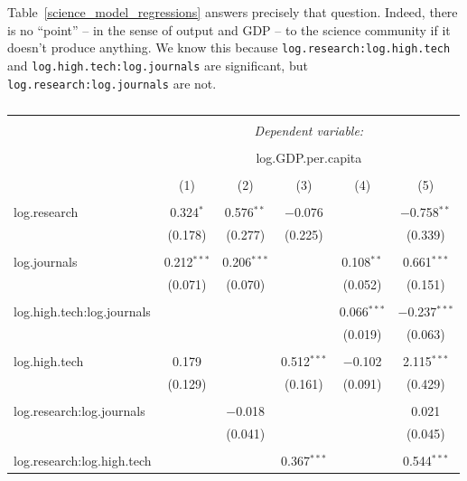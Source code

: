 \documentclass[11pt]{article}
\begin{document}
Table~\ref{science_model_regressions} answers precisely that question. Indeed, there is no ``point'' -- in the sense of output and GDP -- to the science community if it doesn't produce anything. We know this because {\tt log.research:log.high.tech} and {\tt log.high.tech:log.journals} are significant, but {\tt log.research:log.journals} are not.

\begin{landscape}
\small
\begin{table}[!htbp] \centering 
  \caption{} 
  \label{} 
\begin{tabular}{@{\extracolsep{5pt}}lccccc} 
\\[-1.8ex]\hline 
\hline \\[-1.8ex] 
 & \multicolumn{5}{c}{\textit{Dependent variable:}} \\ 
\cline{2-6} 
\\[-1.8ex] & \multicolumn{5}{c}{log.GDP.per.capita} \\ 
\\[-1.8ex] & (1) & (2) & (3) & (4) & (5)\\ 
\hline \\[-1.8ex] 
 log.research & 0.324$^{*}$ & 0.576$^{**}$ & $-$0.076 &  & $-$0.758$^{**}$ \\ 
  & (0.178) & (0.277) & (0.225) &  & (0.339) \\ 
  & & & & & \\ 
 log.journals & 0.212$^{***}$ & 0.206$^{***}$ &  & 0.108$^{**}$ & 0.661$^{***}$ \\ 
  & (0.071) & (0.070) &  & (0.052) & (0.151) \\ 
  & & & & & \\ 
 log.high.tech:log.journals &  &  &  & 0.066$^{***}$ & $-$0.237$^{***}$ \\ 
  &  &  &  & (0.019) & (0.063) \\ 
  & & & & & \\ 
 log.high.tech & 0.179 &  & 0.512$^{***}$ & $-$0.102 & 2.115$^{***}$ \\ 
  & (0.129) &  & (0.161) & (0.091) & (0.429) \\ 
  & & & & & \\ 
 log.research:log.journals &  & $-$0.018 &  &  & 0.021 \\ 
  &  & (0.041) &  &  & (0.045) \\ 
  & & & & & \\ 
 log.research:log.high.tech &  &  & 0.367$^{***}$ &  & 0.544$^{***}$ \\ 

\end{tabular}
\end{table}
\end{landscape}
\end{document}
